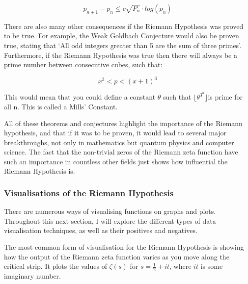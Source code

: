 \documentclass[12pt]{article}
\begin{document}
$$p_{n+1} - p_{n} \leq c \sqrt{P_{n}} \cdot log(p_{n})$$

There are also many other consequences if the Riemann Hypothesis was proved to be true. For example, the Weak Goldbach Conjecture would also be proven true, stating that ‘All odd integers greater than 5 are the sum of three primes’. Furthermore, if the Riemann Hypothesis was true then there will always be a prime number between consecutive cubes, such that:

$$x^3 < p < (x+1)^3$$

This would mean that you could define a constant $\theta$ such that $\lfloor \theta^{3^n} \rfloor$is prime for all n. This is called a Mills’ Constant.

All of these theorems and conjectures highlight the importance of the Riemann hypothesis, and that if it was to be proven, it would lead to several major breakthroughs, not only in mathematics but quantum physics and computer science. The fact that the non-trivial zeros of the Riemann zeta function have such an importance in countless other fields just shows how influential the Riemann Hypothesis is.

\subsubsection{Visualisations of the Riemann Hypothesis}

There are numerous ways of visualising functions on graphs and plots. Throughout this next section, I will explore the different types of data visualisation techniques, as well as their positives and negatives.


The most common form of visualisation for the Riemann Hypothesis is showing how the output of the Riemann zeta function varies as you move along the critical strip. It plots the values of $\zeta(s)$ for $s = \frac{1}{2} + it$, where $it$ is some imaginary number.
\end{document}
